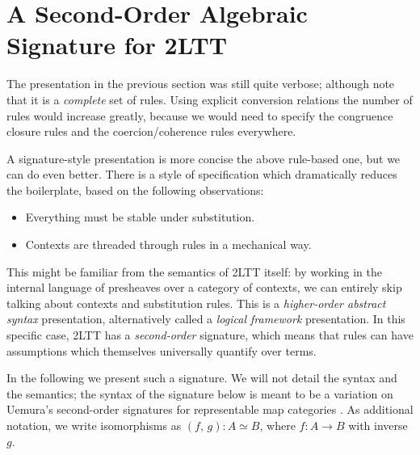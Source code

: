 \documentclass[acmsmall,screen,nonacm]{acmart}
\theoremstyle{remark}
\begin{document}
\section{A Second-Order Algebraic Signature for 2LTT}

The presentation in the previous section was still quite verbose; although note
that it is a \emph{complete} set of rules. Using explicit conversion relations
the number of rules would increase greatly, because we would need to specify the
congruence closure rules and the coercion/coherence rules everywhere.

A signature-style presentation is more concise the above rule-based one, but we
can do even better. There is a style of specification which dramatically reduces
the boilerplate, based on the following observations:
\begin{itemize}
  \item Everything must be stable under substitution.
  \item Contexts are threaded through rules in a mechanical way.
\end{itemize}
This might be familiar from the semantics of 2LTT itself: by working in the
internal language of presheaves over a category of contexts, we can entirely
skip talking about contexts and substitution rules. This is a \emph{higher-order
abstract syntax} presentation, alternatively called a \emph{logical framework}
\cite{DBLP:journals/jacm/HarperHP93} presentation. In this specific case, 2LTT
has a \emph{second-order} signature, which means that rules can have assumptions
which themselves universally quantify over terms.

In the following we present such a signature. We will not detail the syntax and
the semantics; the syntax of the signature below is meant to be a variation on
Uemura's second-order signatures for representable map categories
\cite{uemura}. As additional notation, we write isomorphisms as $(f,\,g) : A
\simeq B$, where $f : A \to B$ with inverse $g$.
\end{document}
